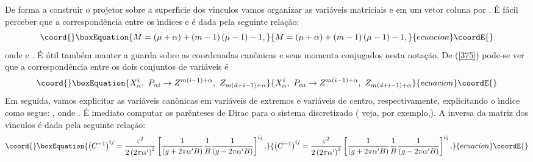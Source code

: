\documentclass[a4paper,thmsa,12pt]{report}
\begin{document}
De forma a construir o projetor sobre a superf\'{\i}cie dos v\'{\i}nculos
vamos organizar as vari\'{a}veis matriciais \coordHE{} e \coordHE{} em um vetor coluna por \coordHE{}. \'{E} f\'{a}cil perceber que a
cor\-res\-pon\-d\^{e}ncia entre os \'{\i}ndices \coordHE{} e \coordHE{} \'{e}
dada pela seguinte rela\c{c}\~{a}o: 
\begin{equation}\coord{}\boxEquation{
M=\left( \mu +\alpha \right) +\left( m-1\right) \left( \mu -1\right) -1,
\label{375}
}{
M=\left( \mu +\alpha \right) +\left( m-1\right) \left( \mu -1\right) -1,
}{ecuacion}\coordE{}\end{equation}
onde \coordHE{} e \coordHE{}. \'{E} \'{u}til tamb\'{e}m manter a
guarda sobre as coordenadas can\^{o}nicas e seus momenta conjugados nesta
nota\c{c}\~{a}o. De (\ref{375}) pode-se ver que a correspond\^{e}ncia entre
os dois conjuntos de vari\'{a}veis \'{e} 
\begin{equation}\coord{}\boxEquation{
X_{\alpha }^{i},~P_{\alpha i}\rightarrow Z^{m\left( i-1\right) +\alpha
},~Z_{m\left( d+i-1\right) +\alpha }  \label{376}
}{
X_{\alpha }^{i},~P_{\alpha i}\rightarrow Z^{m\left( i-1\right) +\alpha
},~Z_{m\left( d+i-1\right) +\alpha }  }{ecuacion}\coordE{}\end{equation}
Em seguida, vamos explicitar as vari\'{a}veis can\^{o}nicas em vari\'{a}veis
de extremos e vari\'{a}veis de centro, respectivamente, explicitando o
\'{\i}ndice \myHighlight{$\alpha $}\coordHE{} como segue: \coordHE{}, onde \coordHE{}. \'{E} imediato computar os par\^{e}nteses de Dirac para o sistema
discretizado ( veja, por exemplo,\cite{kim}). A inversa da matriz dos
v\'{\i}nculos \'{e} dada pela seguinte rela\c{c}\~{a}o: 
\begin{equation}\coord{}\boxEquation{
\left( C^{-1}\right) ^{ij}=\frac{\varepsilon ^{2}}{2\left( 2\pi \alpha
^{\prime }\right) ^{2}}\left[ \frac{1}{\left( g+2\pi \alpha ^{\prime
}B\right) }\frac{1}{B}\frac{1}{\left( g-2\pi \alpha ^{\prime }B\right) }
\right] ^{ij}.  \label{377}
}{
\left( C^{-1}\right) ^{ij}=\frac{\varepsilon ^{2}}{2\left( 2\pi \alpha
^{\prime }\right) ^{2}}\left[ \frac{1}{\left( g+2\pi \alpha ^{\prime
}B\right) }\frac{1}{B}\frac{1}{\left( g-2\pi \alpha ^{\prime }B\right) }
\right] ^{ij}.  }{ecuacion}\coordE{}\end{equation}
\end{document}
